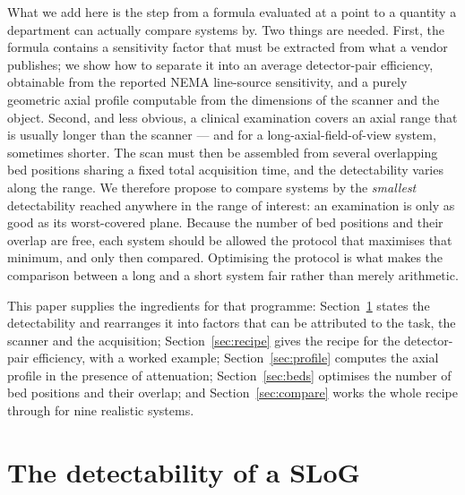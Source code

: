 \documentclass[11pt,a4paper]{article}
\begin{document}
What we add here is the step from a formula evaluated at a point to a quantity a department
can actually compare systems by. Two things are needed. First, the formula contains a
sensitivity factor that must be extracted from what a vendor publishes; we show how to
separate it into an average detector-pair efficiency, obtainable from the reported NEMA
line-source sensitivity, and a purely geometric axial profile computable from the dimensions
of the scanner and the object. Second, and less obvious, a clinical examination covers an
axial range that is usually longer than the scanner --- and for a long-axial-field-of-view
system, sometimes shorter. The scan must then be assembled from several overlapping bed
positions sharing a fixed total acquisition time, and the detectability varies along the
range. We therefore propose to compare systems by the \emph{smallest} detectability reached
anywhere in the range of interest: an examination is only as good as its worst-covered
plane. Because the number of bed positions and their overlap are free, each system should be
allowed the protocol that maximises that minimum, and only then compared. Optimising the
protocol is what makes the comparison between a long and a short system fair rather than
merely arithmetic.

This paper supplies the ingredients for that programme: Section~\ref{sec:aim} states the
detectability and rearranges it into factors that can be attributed to the task, the
scanner and the acquisition; Section~\ref{sec:recipe} gives the recipe for the
detector-pair efficiency, with a worked example; Section~\ref{sec:profile} computes the
axial profile in the presence of attenuation; Section~\ref{sec:beds} optimises the number
of bed positions and their overlap; and Section~\ref{sec:compare} works the whole recipe
through for nine realistic systems.

\section{The detectability of a SLoG}
\label{sec:aim}
\end{document}
